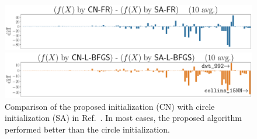 \documentclass[dvipdfmx,10pt,journal,compsoc]{IEEEtran}
\begin{document}
\begin{figure}[!t]
  \centering
  \begin{minipage}{\columnwidth}
    \centering
    \includegraphics[width=\columnwidth]{circle/plot/diff_FR_50.pdf}
  \end{minipage}
  \begin{minipage}{\columnwidth}
    \centering
    \includegraphics[width=\columnwidth]{circle/plot/diff_L-BFGS_50.pdf}
  \end{minipage}
  \caption{
    Comparison of the proposed initialization (\textsf{CN}) with circle initialization (\textsf{SA}) in Ref.~\cite{ghassemitoosiSimulatedAnnealingPreProcessing2016}.
    In most cases, the proposed algorithm performed better than the circle initialization.
  }
  \label{fig:diff}
\end{figure}
\end{document}
